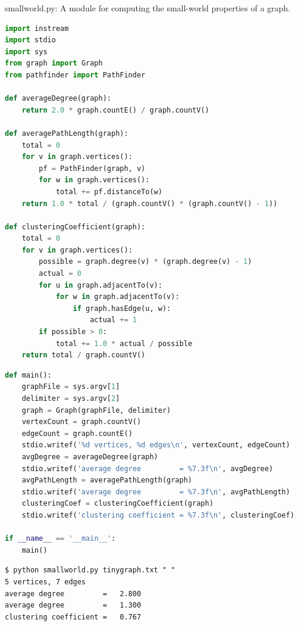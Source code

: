\documentclass[8pt,a4paper,compress,handout]{beamer}
\begin{document}
\begin{frame}[fragile]
\begin{framed}
\tiny smallworld.py: A module for computing the small-world properties of a graph.
\end{framed}

\begin{lstlisting}[language=Python]
import instream
import stdio
import sys
from graph import Graph
from pathfinder import PathFinder

def averageDegree(graph):
    return 2.0 * graph.countE() / graph.countV()

def averagePathLength(graph):
    total = 0
    for v in graph.vertices():
        pf = PathFinder(graph, v)
        for w in graph.vertices():
            total += pf.distanceTo(w)
    return 1.0 * total / (graph.countV() * (graph.countV() - 1))

def clusteringCoefficient(graph):
    total = 0
    for v in graph.vertices():
        possible = graph.degree(v) * (graph.degree(v) - 1)
        actual = 0
        for u in graph.adjacentTo(v):
            for w in graph.adjacentTo(v):
                if graph.hasEdge(u, w):
                    actual += 1
        if possible > 0:
            total += 1.0 * actual / possible
    return total / graph.countV()
\end{lstlisting}
\end{frame}

\begin{frame}[fragile]
\begin{lstlisting}[language=Python]
def main():
    graphFile = sys.argv[1]
    delimiter = sys.argv[2]
    graph = Graph(graphFile, delimiter)
    vertexCount = graph.countV()
    edgeCount = graph.countE()
    stdio.writef('%d vertices, %d edges\n', vertexCount, edgeCount)
    avgDegree = averageDegree(graph)
    stdio.writef('average degree         = %7.3f\n', avgDegree)
    avgPathLength = averagePathLength(graph)
    stdio.writef('average degree         = %7.3f\n', avgPathLength)
    clusteringCoef = clusteringCoefficient(graph)
    stdio.writef('clustering coefficient = %7.3f\n', clusteringCoef)

if __name__ == '__main__':
    main()
\end{lstlisting}

\begin{lstlisting}[language={}]
$ python smallworld.py tinygraph.txt " "
5 vertices, 7 edges
average degree         =   2.800
average degree         =   1.300
clustering coefficient =   0.767
\end{lstlisting}
\end{frame}
\end{document}
